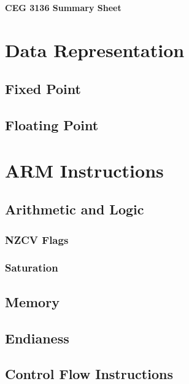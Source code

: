 \documentclass[12pt,letterpaper]{article} \usepackage{amsmath} \usepackage{graphicx} \usepackage[margin=1in]{geometry} \usepackage{longtable}  \usepackage{amssymb}
\begin{document}
	
	\begin{center}
		\Large\textbf{CEG 3136 Summary Sheet} \\
		\vspace{0.5em}
	\end{center}	
	
	\section{Data Representation}
	
	\subsection{Fixed Point}
	
	\subsection{Floating Point}
	
	\section{ARM Instructions}
	
	\subsection{Arithmetic and Logic}
	
	\subsubsection{NZCV Flags}
	
	\subsubsection{Saturation}
	
	\subsection{Memory}
	
	\subsection{Endianess}
	
	\subsection{Control Flow Instructions}
	
\end{document}
